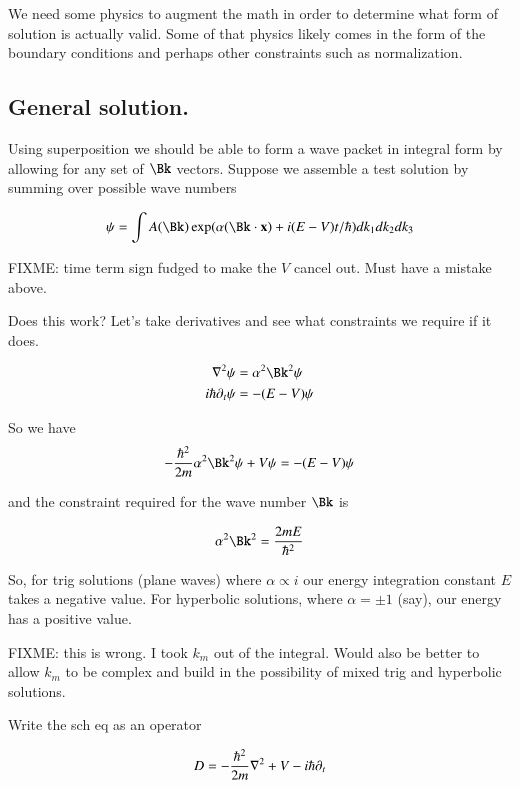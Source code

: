\documentclass{article}
\begin{document}
We need some physics
to augment the math in order to determine what form of solution is actually valid.  Some of that physics likely comes in the form of the boundary conditions and perhaps other constraints such as normalization.

\subsection{ General solution. }

Using superposition we should be able to form a wave packet in integral form
by allowing for any set of $\Bk$ vectors.  Suppose we assemble a test solution by summing over possible wave numbers

\begin{align*}
\psi = \int A(\Bk) \exp(\alpha(\Bk \cdot \Bx) + i(E - V) t/\hbar) dk_1 dk_2 dk_3 \\
\end{align*}

FIXME: time term sign fudged to make the $V$ cancel out.  Must have a mistake above.

Does this work?  Let's take derivatives and see what constraints we require if it does.

\begin{align*}
\grad^2 \psi &= \alpha^2 \Bk^2 \psi \\
i \hbar \partial_t \psi &= -(E - V) \psi
\end{align*}

So we have
\begin{align*}
-\frac{\hbar^2}{2m} \alpha^2 \Bk^2 \psi + V\psi = -(E-V) \psi
\end{align*}

and the constraint required for the wave number $\Bk$ is 

\begin{align*}
\alpha^2 \Bk^2 = \frac{2 m E }{\hbar^2}
\end{align*}

So, for trig solutions (plane waves) where $\alpha \propto i$ our energy integration constant $E$ takes a negative value.
For hyperbolic solutions, where $\alpha = \pm 1$ (say), our energy has a positive value.

FIXME: this is wrong.  I took $k_m$ out of the integral.  Would also be
better to allow $k_m$ to be complex and build in the possibility of 
mixed trig and hyperbolic solutions.

Write the sch eq as an operator

\begin{align*}
D = -\frac{\hbar^2}{2m}\nabla^2 + V -i\hbar\partial_t
\end{align*}
\end{document}
